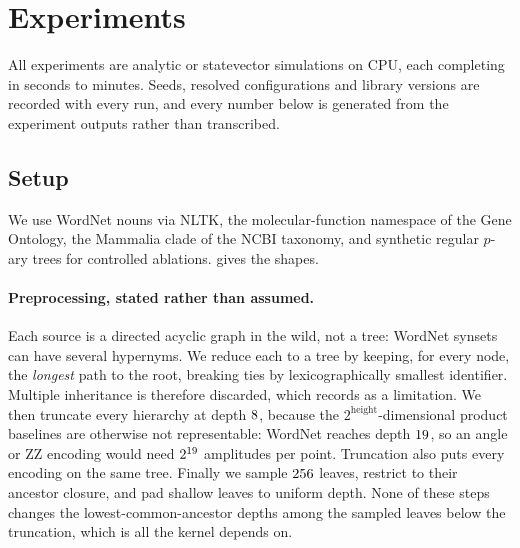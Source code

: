 \section{Experiments}
\label{sec:experiments}

All experiments are analytic or statevector simulations on CPU, each completing in
seconds to minutes. Seeds, resolved configurations and library versions are recorded
with every run, and every number below is generated from the experiment outputs rather
than transcribed.

\subsection{Setup}
\label{subsec:setup}

We use WordNet nouns via NLTK, the molecular-function namespace of the Gene Ontology,
the Mammalia clade of the NCBI taxonomy, and synthetic regular $p$-ary trees for
controlled ablations.  gives the shapes.

\begin{table}
  \centering
  \caption{The four hierarchies after preprocessing. Source columns describe the full
    reduced tree; the rest describe the sample the kernels are evaluated on. Qubits is
    $\lceil \log_2 \abs{V} \rceil$ for the path-state encoding.}
  \label{tab:datasets}
  \small
  
\end{table}

\paragraph{Preprocessing, stated rather than assumed.}
Each source is a directed acyclic graph in the wild, not a tree: WordNet synsets can
have several hypernyms. We reduce each to a tree by keeping, for every node, the
\emph{longest} path to the root, breaking ties by lexicographically smallest identifier.
Multiple inheritance is therefore discarded, which  records as a
limitation. We then truncate every hierarchy at depth $8$, because the
$2^{\text{height}}$-dimensional product baselines are otherwise not representable:
WordNet reaches depth $19$, so an angle or ZZ encoding would need
$2^{19}$ amplitudes per point. Truncation also puts every encoding on the
same tree. Finally we sample $256$ leaves, restrict to their ancestor closure,
and pad shallow leaves to uniform depth. None of these steps changes the
lowest-common-ancestor depths among the sampled leaves below the truncation, which is
all the kernel depends on.

